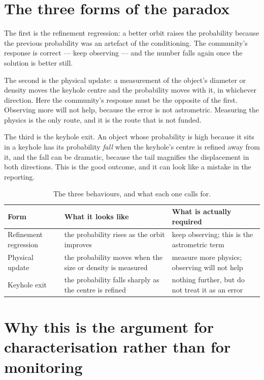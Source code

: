 \section{The three forms of the paradox}

The first is the refinement regression: a better orbit raises the
probability because the previous probability was an artefact of the
conditioning. The community's response is correct --- keep observing --- and
the number falls again once the solution is better still.

The second is the physical update: a measurement of the object's diameter or
density moves the keyhole centre and the probability moves with it, in
whichever direction. Here the community's response must be the opposite of
the first. Observing more will not help, because the error is not
astrometric. Measuring the physics is the only route, and it is the route
that is not funded.

The third is the keyhole exit. An object whose probability is high because it
sits in a keyhole has its probability \emph{fall} when the keyhole's centre
is refined away from it, and the fall can be dramatic, because the tail
magnifies the displacement in both directions. This is the good outcome, and
it can look like a mistake in the reporting.

\begin{table}[!htbp]
\centering
\small
\caption{The three behaviours, and what each one calls for.}
\label{tab:paradoxes}
\begin{tabularx}{\textwidth}{@{}P{1.32in}P{1.24in}Y@{}}
\toprule
{}
\textbf{Form} & \textbf{What it looks like} & \textbf{What is actually
required} \\
\midrule
Refinement regression & the probability rises as the orbit improves &
keep observing; this is the astrometric term \\
Physical update & the probability moves when the size or density is
measured & measure more physics; observing will not help \\
Keyhole exit & the probability falls sharply as the centre is refined &
nothing further, but do not treat it as an error \\
\bottomrule
\end{tabularx}
\end{table}

\section{Why this is the argument for characterisation rather than for monitoring}

